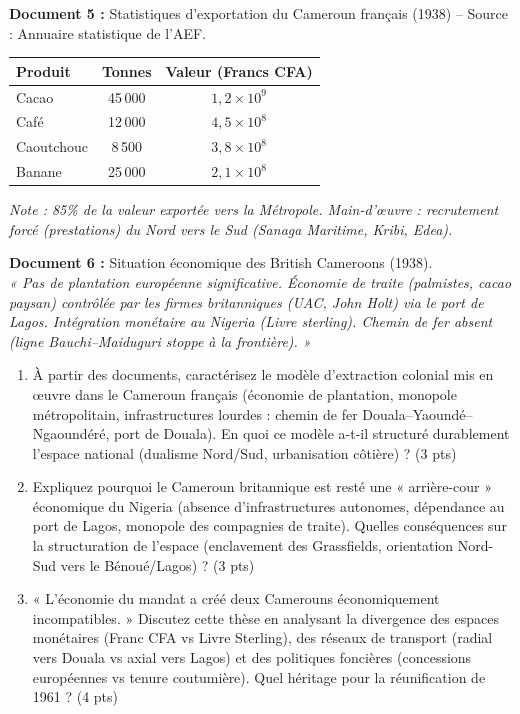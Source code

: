 \documentclass[11pt]{article}
\begin{document}
\begin{exercice}
\textbf{Document 5 :} Statistiques d'exportation du Cameroun français (1938) -- Source : Annuaire statistique de l'AEF. \\
\begin{tabular}{lcc}
\hline
Produit & Tonnes & Valeur (Francs CFA) \\
\hline
Cacao & 45\,000 & $1,2 \times 10^9$ \\
Café & 12\,000 & $4,5 \times 10^8$ \\
Caoutchouc & 8\,500 & $3,8 \times 10^8$ \\
Banane & 25\,000 & $2,1 \times 10^8$ \\
\hline
\end{tabular}
\textit{Note : 85\% de la valeur exportée vers la Métropole. Main-d'œuvre : recrutement forcé (prestations) du Nord vers le Sud (Sanaga Maritime, Kribi, Edea).}

\textbf{Document 6 :} Situation économique des British Cameroons (1938). \\
\textit{« Pas de plantation européenne significative. Économie de traite (palmistes, cacao paysan) contrôlée par les firmes britanniques (UAC, John Holt) via le port de Lagos. Intégration monétaire au Nigeria (Livre sterling). Chemin de fer absent (ligne Bauchi--Maiduguri stoppe à la frontière). »}

\begin{enumerate}
    \item À partir des documents, caractérisez le modèle d'extraction colonial mis en œuvre dans le Cameroun français (économie de plantation, monopole métropolitain, infrastructures lourdes : chemin de fer Douala--Yaoundé--Ngaoundéré, port de Douala). En quoi ce modèle a-t-il structuré durablement l'espace national (dualisme Nord/Sud, urbanisation côtière) ? (3 pts)
    \item Expliquez pourquoi le Cameroun britannique est resté une « arrière-cour » économique du Nigeria (absence d'infrastructures autonomes, dépendance au port de Lagos, monopole des compagnies de traite). Quelles conséquences sur la structuration de l'espace (enclavement des Grassfields, orientation Nord-Sud vers le Bénoué/Lagos) ? (3 pts)
    \item « L'économie du mandat a créé deux Camerouns économiquement incompatibles. » Discutez cette thèse en analysant la divergence des espaces monétaires (Franc CFA vs Livre Sterling), des réseaux de transport (radial vers Douala vs axial vers Lagos) et des politiques foncières (concessions européennes vs tenure coutumière). Quel héritage pour la réunification de 1961 ? (4 pts)
\end{enumerate}
\end{exercice}
\end{document}
